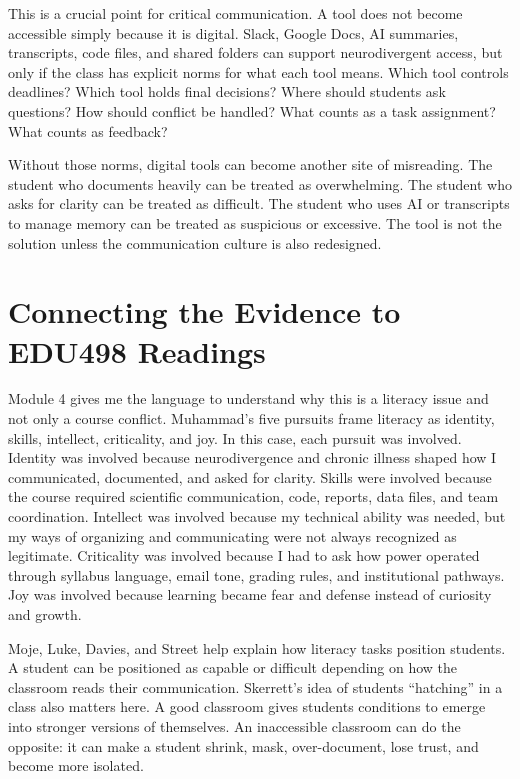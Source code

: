 \documentclass[12pt]{article}
\begin{document}
This is a crucial point for critical communication. A tool does not become accessible simply because it is digital. Slack, Google Docs, AI summaries, transcripts, code files, and shared folders can support neurodivergent access, but only if the class has explicit norms for what each tool means. Which tool controls deadlines? Which tool holds final decisions? Where should students ask questions? How should conflict be handled? What counts as a task assignment? What counts as feedback?

Without those norms, digital tools can become another site of misreading. The student who documents heavily can be treated as overwhelming. The student who asks for clarity can be treated as difficult. The student who uses AI or transcripts to manage memory can be treated as suspicious or excessive. The tool is not the solution unless the communication culture is also redesigned.

\section*{Connecting the Evidence to EDU498 Readings}

Module 4 gives me the language to understand why this is a literacy issue and not only a course conflict. Muhammad's five pursuits frame literacy as identity, skills, intellect, criticality, and joy. In this case, each pursuit was involved. Identity was involved because neurodivergence and chronic illness shaped how I communicated, documented, and asked for clarity. Skills were involved because the course required scientific communication, code, reports, data files, and team coordination. Intellect was involved because my technical ability was needed, but my ways of organizing and communicating were not always recognized as legitimate. Criticality was involved because I had to ask how power operated through syllabus language, email tone, grading rules, and institutional pathways. Joy was involved because learning became fear and defense instead of curiosity and growth.

Moje, Luke, Davies, and Street help explain how literacy tasks position students. A student can be positioned as capable or difficult depending on how the classroom reads their communication. Skerrett's idea of students ``hatching'' in a class also matters here. A good classroom gives students conditions to emerge into stronger versions of themselves. An inaccessible classroom can do the opposite: it can make a student shrink, mask, over-document, lose trust, and become more isolated.
\end{document}
